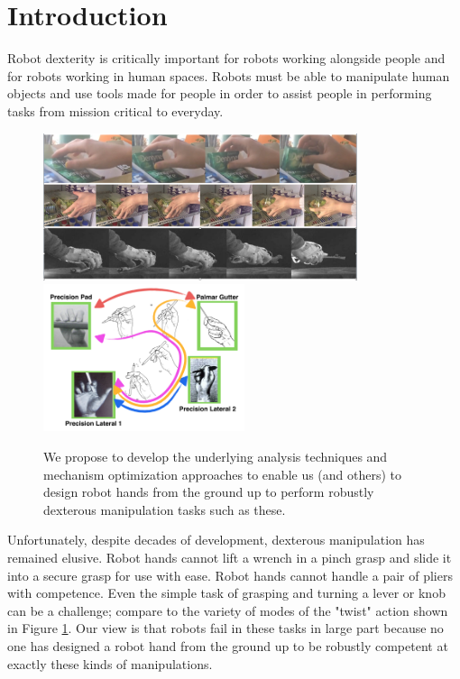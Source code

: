 \section{Introduction}

Robot dexterity is critically important for robots working alongside people and for robots working in human spaces.    Robots must be able to manipulate human objects and use tools made for people in order to assist people in performing tasks from mission critical to everyday.   

\begin{figure}
\begin{center}
{\includegraphics[height=1.7in]{./figs/acquireObject.png}}
{\includegraphics[height=1.7in]{./figs/smallGraspNet.png}}
\end{center}
\caption[]{We propose to develop the underlying analysis techniques and mechanism optimization approaches to enable us (and others) to design  robot hands from the ground up to perform robustly dexterous manipulation tasks such as these.}
\label{DexterousExamples}
\end{figure}

Unfortunately, despite decades of development, dexterous manipulation has remained elusive.   Robot hands cannot lift a wrench in a pinch grasp and slide it into a secure grasp for use with ease.   Robot hands cannot handle a pair of pliers with competence.   Even the simple task of grasping and turning a lever or knob can be a challenge;   compare to the variety of modes of the "twist" action shown in Figure \ref{DexterousExamples}.   Our view is that robots fail in these tasks in large part because no one has designed a robot hand from the ground up to be robustly competent at exactly these kinds of manipulations.

